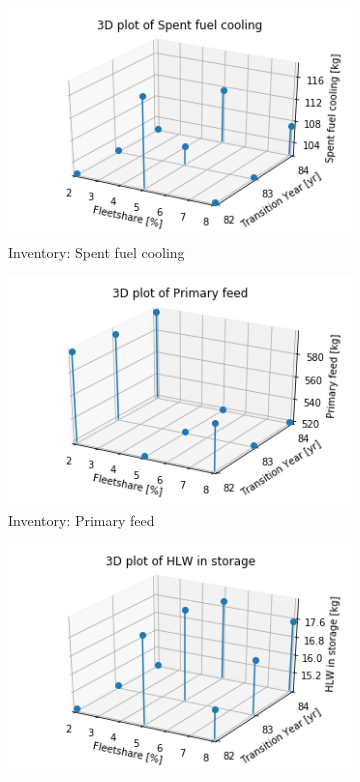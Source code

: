 \begin{figure}[]
    \centering
    \begin{subfigure}[t]{\textwidth}
    \centering
        \includegraphics[width=0.58\linewidth]{figures/3d_sfc} 
        \caption{Inventory: Spent fuel cooling}
        \label{fig:3d_sfc}
    \end{subfigure}
    \begin{subfigure}[t]{0.58\textwidth}
        \centering
        \includegraphics[width=\linewidth]{figures/3d_pf} 
        \caption{Inventory: Primary feed}
	    \label{fig:3d_pf}
    \end{subfigure}
    \begin{subfigure}[t]{0.58\textwidth}
        \centering
        \includegraphics[width=\linewidth]{figures/3d_hlw} 

\end{subfigure}
\end{figure}
